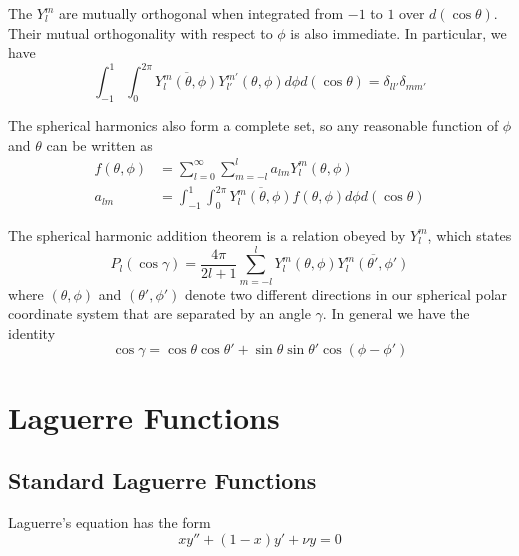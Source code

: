 \documentclass[12pt, a4paper, oneside, openright, titlepage]{book}
\begin{document}
\begin{defn}
    The $Y_l^m$ are mutually orthogonal when integrated from $-1$ to $1$ over $d(\cos\theta)$. Their mutual orthogonality with respect to $\phi$ is also immediate. In particular, we have \begin{equation*}
        \int_{-1}^1\int_0^{2\pi}\overline{Y_l^m(\theta,\phi)}Y_{l'}^{m'}(\theta,\phi)d\phi d(\cos\theta) = \delta_{ll'}\delta_{mm'}
    \end{equation*}
\end{defn}

The spherical harmonics also form a complete set, so any reasonable function of $\phi$ and $\theta$ can be written as \begin{align*}
    f(\theta,\phi) &= \sum_{l=0}^{\infty}\sum_{m=-l}^la_{lm}Y_l^m(\theta,\phi) \\
    a_{lm} &= \int_{-1}^1\int_0^{2\pi}\overline{Y_l^m(\theta,\phi)}f(\theta,\phi)d\phi d(\cos\theta)
\end{align*}

\begin{namthm}
    The spherical harmonic addition theorem is a relation obeyed by $Y_l^m$, which states \begin{equation*}
        P_l(\cos\gamma) = \frac{4\pi}{2l+1}\sum_{m=-l}^lY_l^m(\theta,\phi)\overline{Y_l^m(\theta',\phi')}
    \end{equation*}
    where $(\theta,\phi)$ and $(\theta',\phi')$ denote two different directions in our spherical polar coordinate system that are separated by an angle $\gamma.$ In general we have the identity \begin{equation*}
        \cos\gamma = \cos\theta\cos\theta' + \sin\theta\sin\theta'\cos(\phi - \phi')
    \end{equation*}
\end{namthm}




\chapter{Laguerre Functions}

\section{Standard Laguerre Functions}

\begin{defn}
    Laguerre's equation has the form \begin{equation}
        xy'' + (1-x)y' + \nu y = 0
    \end{equation}
\end{defn}
\end{document}
